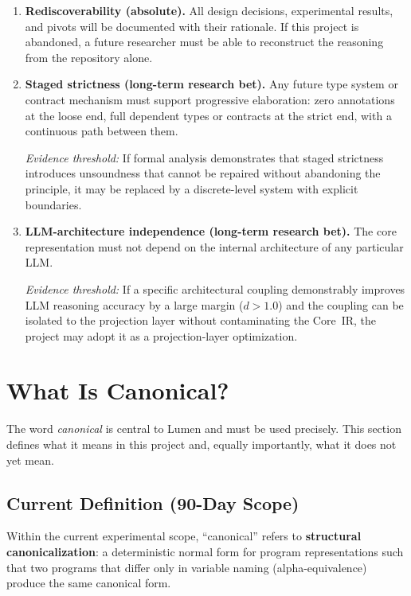 \documentclass[11pt]{article}
\begin{document}
\begin{enumerate}
  \item \textbf{Rediscoverability (absolute).}
        All design decisions, experimental results, and pivots will be
        documented with their rationale.  If this project is abandoned,
        a future researcher must be able to reconstruct the reasoning
        from the repository alone.

  \item \textbf{Staged strictness (long-term research bet).}
        Any future type system or contract mechanism must support
        progressive elaboration: zero annotations at the loose end,
        full dependent types or contracts at the strict end, with a
        continuous path between them.

        \emph{Evidence threshold:}  If formal analysis demonstrates
        that staged strictness introduces unsoundness that cannot be
        repaired without abandoning the principle, it may be replaced
        by a discrete-level system with explicit boundaries.

  \item \textbf{LLM-architecture independence (long-term research
        bet).}
        The core representation must not depend on the internal
        architecture of any particular LLM.

        \emph{Evidence threshold:}  If a specific architectural
        coupling demonstrably improves LLM reasoning accuracy by a
        large margin ($d > 1.0$) and the coupling can be isolated to
        the projection layer without contaminating the Core~IR, the
        project may adopt it as a projection-layer optimization.
\end{enumerate}


\section{What Is Canonical?}
\label{sec:canonical}

The word \emph{canonical} is central to Lumen and must be used
precisely.  This section defines what it means in this project and,
equally importantly, what it does not yet mean.

\subsection*{Current Definition (90-Day Scope)}

Within the current experimental scope, ``canonical'' refers to
\textbf{structural canonicalization}: a deterministic normal form for
program representations such that two programs that differ only in
variable naming (alpha-equivalence) produce the same canonical form.
\end{document}
